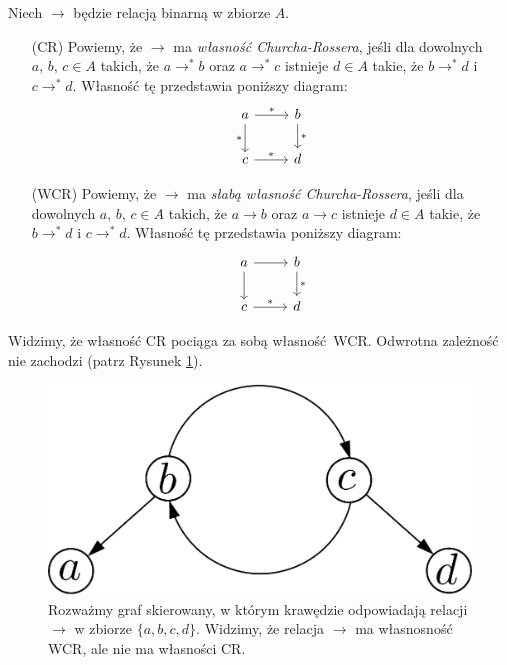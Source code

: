 \begin{definicja}
  Niech \(\to\) będzie relacją binarną w zbiorze \(A\). 
\begin{enumerate}
  \setlength\itemsep{0em}
  \item[(CR) ] Powiemy, że \(\to\) ma \emph{własność Churcha-Rossera}, jeśli
               dla dowolnych \(a,\,b,\,c\in A\) takich, że
               \(a\to^{*}b\) oraz \(a\to^{*} c\) istnieje \(d\in A\)
               takie, że \(b\to^{*} d\) i \(c\to^{*} d\).\label{def:cr_property_untyped}
               Własność tę przedstawia poniższy diagram:
               \[ \begin{tikzcd}
               a \arrow{r}{*} \arrow[swap]{d}{*} & b \arrow{d}{*} \\%
               c \arrow{r}{*}& d
               \end{tikzcd}
               \] 

  \item[(WCR)] Powiemy, że \(\to\) ma \emph{słabą własność 
               Churcha-Rossera}, jeśli dla dowolnych \(a,\,b,\,c\in A\)
               takich, że \(a\to b\) oraz \(a\to c\) istnieje \(d\in A\) 
               takie, że \(b\to^{*} d\) i \(c\to^{*} d\).\label{def:wcr_property_untyped}
               Własność tę przedstawia poniższy diagram:
               \[ \begin{tikzcd}
               a \arrow{r}{} \arrow[swap]{d}{} & b \arrow{d}{*} \\%
               c \arrow{r}{*}& d
               \end{tikzcd}
               \] 
\end{enumerate}
  Widzimy, że własność CR pociąga za sobą własność WCR. Odwrotna zależność nie zachodzi (patrz Rysunek \ref{fig:wcrnotcr}).
\end{definicja}

\begin{figure}[!h]
  \centering
  \includegraphics[width=0.32\linewidth]{../wcrnotcr_example}
  \caption{Rozważmy graf skierowany, w którym krawędzie odpowiadają relacji \(\to\) w zbiorze \(\{a,b,c,d\}\). Widzimy, że relacja \(\to\) ma własnosność WCR, ale nie ma własności CR.}\label{fig:wcrnotcr}
\end{figure}

